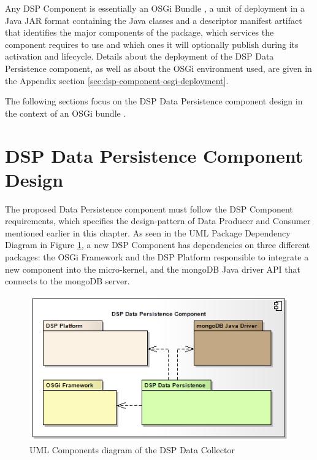 Any DSP Component is essentially an OSGi Bundle \cite{osgi-intro}, a unit of
deployment in a Java JAR format \cite{java-tutorial} containing the Java
classes and a descriptor manifest artifact that identifies the major components
of the package, which services the component requires to use and which ones it
will optionally publish during its activation and lifecycle. Details about the
deployment of the DSP Data Persistence component, as well as about the OSGi
environment used, are given in the Appendix section
\ref{sec:dsp-component-osgi-deployment}.

The following sections focus on the DSP Data Persistence component 
design in the context of an OSGi bundle \cite{osgi}.

\section{DSP Data Persistence Component Design}
\label{sec:dsp-data-comp-design}

The proposed Data Persistence component must follow the DSP Component
requirements, which specifies the design-pattern of Data Producer and Consumer
mentioned earlier in this chapter. As seen in the UML Package  Dependency
Diagram in Figure \ref{fig:DSP-Data-Persistence-Packages-Dependency}, a new
DSP Component has dependencies on three different packages: the OSGi Framework
and the DSP Platform responsible to integrate a new component into the
micro-kernel, and the mongoDB Java driver API that connects to the mongoDB
server.

\begin{figure}[!h]
  \centering
  \includegraphics[scale=0.65]{../diagrams/DSP-Data-Persistence-Packages-Dependency}
  \caption{UML Components diagram of the DSP Data Collector}
  \label{fig:DSP-Data-Persistence-Packages-Dependency}
\end{figure}

